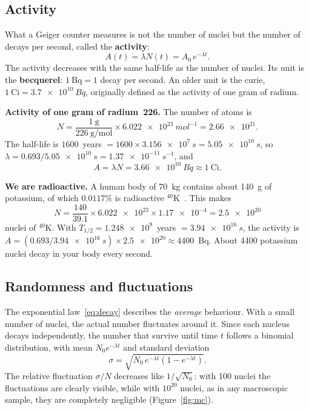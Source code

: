 \documentclass[11pt,a4paper]{article}
\newcommand{\iso}[2]{\ensuremath{{}^{#1}\mathrm{#2}}}         %
\begin{document}
\subsection{Activity}

What a Geiger counter measures is not the number of nuclei but the number of decays per second, called the \textbf{activity}:
\begin{equation}
  A(t) = \lambda N(t) = A_0\, e^{-\lambda t}.
  \label{eq:activity}
\end{equation}
The activity decreases with the same half-life as the number of nuclei. Its unit is the \textbf{becquerel}: $1~\text{Bq} = 1$ decay per second. An older unit is the curie, $1~\text{Ci} = \SI{3.7e10}{Bq}$, originally defined as the activity of one gram of radium.

\begin{examplebox}
\textbf{Activity of one gram of radium~226.} The number of atoms is
\[
N = \frac{1~\text{g}}{226~\text{g/mol}} \times \SI{6.022e23}{mol^{-1}} = \num{2.66e21}.
\]
The half-life is $1600$~years $= 1600 \times \SI{3.156e7}{s} = \SI{5.05e10}{s}$, so $\lambda = 0.693/\SI{5.05e10}{s} = \SI{1.37e-11}{s^{-1}}$, and
\[
A = \lambda N = \SI{3.66e10}{Bq} \approx 1~\text{Ci}.
\]
\end{examplebox}

\begin{examplebox}
\textbf{We are radioactive.} A human body of 70~kg contains about 140~g of potassium, of which $0.0117\%$ is radioactive \iso{40}{K}~\cite{NUBASE2020}. This makes
\[
N = \frac{140}{39.1} \times \num{6.022e23} \times \num{1.17e-4} = \num{2.5e20}
\]
nuclei of \iso{40}{K}. With $T_{1/2} = \num{1.248e9}$~years $= \SI{3.94e16}{s}$, the activity is $A = (0.693/\SI{3.94e16}{s}) \times \num{2.5e20} \approx 4400$~Bq. About 4400 potassium nuclei decay in your body every second.
\end{examplebox}

\subsection{Randomness and fluctuations}

The exponential law~\eqref{eq:decay} describes the \emph{average} behaviour. With a small number of nuclei, the actual number fluctuates around it. Since each nucleus decays independently, the number that survive until time $t$ follows a binomial distribution, with mean $N_0 e^{-\lambda t}$ and standard deviation
\[
\sigma = \sqrt{N_0\, e^{-\lambda t}\left(1 - e^{-\lambda t}\right)} .
\]
The relative fluctuation $\sigma/N$ decreases like $1/\sqrt{N_0}$: with 100 nuclei the fluctuations are clearly visible, while with $10^{20}$ nuclei, as in any macroscopic sample, they are completely negligible (Figure~\ref{fig:mc}).
\end{document}
